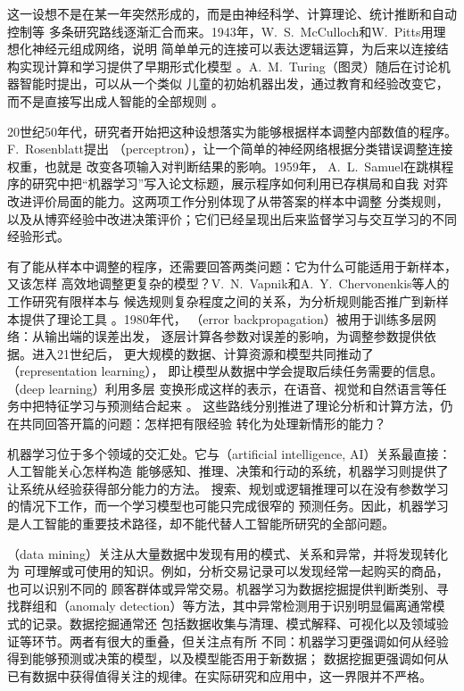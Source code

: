 这一设想不是在某一年突然形成的，而是由神经科学、计算理论、统计推断和自动控制等
多条研究路线逐渐汇合而来。1943年，W.~S.~McCulloch和W.~Pitts用理想化神经元组成网络，说明
简单单元的连接可以表达逻辑运算，为后来以连接结构实现计算和学习提供了早期形式化模型
。A.~M.~Turing（图灵）随后在讨论机器智能时提出，可以从一个类似
儿童的初始机器出发，通过教育和经验改变它，而不是直接写出成人智能的全部规则
。

20世纪50年代，研究者开始把这种设想落实为能够根据样本调整内部数值的程序。F.~Rosenblatt提出
（perceptron），让一个简单的神经网络根据分类错误调整连接权重，也就是
改变各项输入对判断结果的影响。1959年，
A.~L.~Samuel在跳棋程序的研究中把“机器学习”写入论文标题，展示程序如何利用已存棋局和自我
对弈改进评价局面的能力。这两项工作分别体现了从带答案的样本中调整
分类规则，以及从博弈经验中改进决策评价；它们已经呈现出后来监督学习与交互学习的不同
经验形式。

有了能从样本中调整的程序，还需要回答两类问题：它为什么可能适用于新样本，又该怎样
高效地调整更复杂的模型？V.~N.~Vapnik和A.~Y.~Chervonenkis等人的工作研究有限样本与
候选规则复杂程度之间的关系，为分析规则能否推广到新样本提供了理论工具
。1980年代，
（error backpropagation）被用于训练多层网络：从输出端的误差出发，
逐层计算各参数对误差的影响，为调整参数提供依据。进入21世纪后，
更大规模的数据、计算资源和模型共同推动了（representation learning），
即让模型从数据中学会提取后续任务需要的信息。（deep learning）利用多层
变换形成这样的表示，在语音、视觉和自然语言等任务中把特征学习与预测结合起来
。
这些路线分别推进了理论分析和计算方法，仍在共同回答开篇的问题：怎样把有限经验
转化为处理新情形的能力？

机器学习位于多个领域的交汇处。它与（artificial intelligence, AI）关系最直接：人工智能关心怎样构造
能够感知、推理、决策和行动的系统，机器学习则提供了让系统从经验获得部分能力的方法。
搜索、规划或逻辑推理可以在没有参数学习的情况下工作，而一个学习模型也可能只完成很窄的
预测任务。因此，机器学习是人工智能的重要技术路径，却不能代替人工智能所研究的全部问题。

（data mining）关注从大量数据中发现有用的模式、关系和异常，并将发现转化为
可理解或可使用的知识。例如，分析交易记录可以发现经常一起购买的商品，也可以识别不同的
顾客群体或异常交易。机器学习为数据挖掘提供判断类别、寻找群组和（anomaly
detection）等方法，其中异常检测用于识别明显偏离通常模式的记录。数据挖掘通常还
包括数据收集与清理、模式解释、可视化以及领域验证等环节。两者有很大的重叠，但关注点有所
不同：机器学习更强调如何从经验得到能够预测或决策的模型，以及模型能否用于新数据；
数据挖掘更强调如何从已有数据中获得值得关注的规律。在实际研究和应用中，这一界限并不严格。

